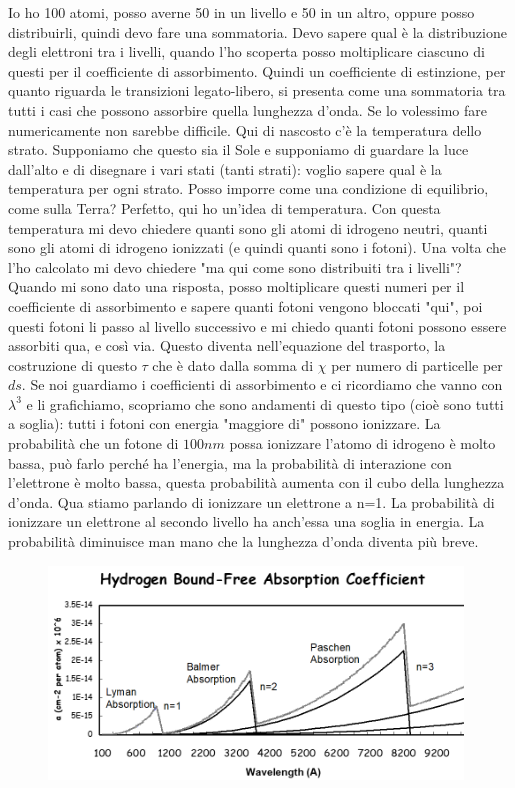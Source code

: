 \documentclass[a4paper,11pt]{article}
\begin{document}
Io ho 100 atomi, posso averne 50 in un livello e 50 in un altro, oppure posso distribuirli, quindi devo fare una sommatoria.
Devo sapere qual è la distribuzione degli elettroni tra i livelli, quando l'ho scoperta posso moltiplicare ciascuno di questi per il coefficiente di assorbimento. 
\newline
Quindi un coefficiente di estinzione, per quanto riguarda le transizioni legato-libero, si presenta come una sommatoria tra tutti i casi che possono assorbire quella lunghezza d'onda.
\newline
Se lo volessimo fare numericamente non sarebbe difficile.
Qui di nascosto c'è la temperatura dello strato. Supponiamo che questo sia il Sole e supponiamo di guardare la luce dall'alto e di disegnare i vari stati (tanti strati): voglio sapere qual è la temperatura per ogni strato. Posso imporre come una condizione di equilibrio, come sulla Terra? Perfetto, qui ho un'idea di temperatura. Con questa temperatura mi devo chiedere quanti sono gli atomi di idrogeno neutri, quanti sono gli atomi di idrogeno ionizzati (e quindi quanti sono i fotoni). Una volta che l'ho calcolato mi devo chiedere "ma qui come sono distribuiti tra i livelli"? Quando mi sono dato una risposta, posso moltiplicare questi numeri per il coefficiente di assorbimento e sapere quanti fotoni vengono bloccati "qui", poi questi fotoni li passo al livello successivo e mi chiedo quanti fotoni possono essere assorbiti qua, e così via.
Questo diventa nell'equazione del trasporto, la costruzione di questo $\tau$ che è dato dalla somma di $\chi$ per numero di particelle per $ds$.
\newline
Se noi guardiamo i coefficienti di assorbimento e ci ricordiamo che vanno con $\lambda^3$ e li grafichiamo, scopriamo che sono andamenti di questo tipo (cioè sono tutti a soglia): tutti i fotoni con energia "maggiore di" possono ionizzare.
\newline
La probabilità che un fotone di $100nm$ possa ionizzare l'atomo di idrogeno è molto bassa, può farlo perché ha l'energia, ma la probabilità di interazione con l'elettrone è molto bassa, questa probabilità aumenta con il cubo della lunghezza d'onda. Qua stiamo parlando di ionizzare un elettrone a n=1.
La probabilità di ionizzare un elettrone al secondo livello ha anch'essa una soglia in energia. La probabilità diminuisce man mano che la lunghezza d'onda diventa più breve.
\newline
\begin{figure} [h]
    \centering
    \includegraphics[width=11cm]{28-10.30(energie_di_ionizzazione_idrogeno).png}
    \label{fig:energie_ionizzazione_idrogeno}
\end{figure}
\end{document}
